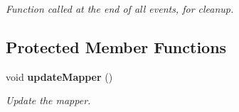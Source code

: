 \begin{DoxyCompactItemize}
\begin{DoxyCompactList}\small\item\em Function called at the end of all events, for cleanup. \item\end{DoxyCompactList}\end{DoxyCompactItemize}
\subsection*{Protected Member Functions}
\begin{DoxyCompactItemize}
\item 
void {\bf updateMapper} ()\label{classCALICE_1_1PedestalProcessor_a3efefa4461047861ad09e26ff06c47ff}

\begin{DoxyCompactList}\small\item\em Update the mapper. \item\end{DoxyCompactList}\end{DoxyCompactItemize}
